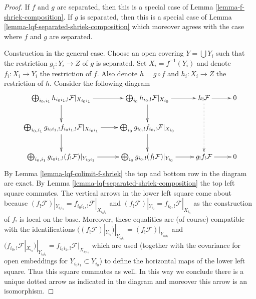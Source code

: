 \documentclass{stacks-project}
\theoremstyle{plain}
\theoremstyle{definition}
\theoremstyle{remark}
\numberwithin{equation}{subsection}
\begin{document}
\begin{proof}
If $f$ and $g$ are separated, then this is a special case of
Lemma \ref{lemma-f-shriek-composition}.
If $g$ is separated, then this is a special case of
Lemma \ref{lemma-lqf-separated-shriek-composition}
which moreover agrees with the case where $f$ and $g$ are separated.

\medskip\noindent
Construction in the general case. Choose an open covering $Y = \bigcup Y_i$
such that the restriction $g_i : Y_i \to Z$ of $g$ is separated.
Set $X_i = f^{-1}(Y_i)$ and denote $f_i : X_i \to Y_i$ the restriction
of $f$. Also denote $h = g \circ f$ and $h_i : X_i \to Z$ the restriction
of $h$. Consider the following diagram
$$
\xymatrix{
\bigoplus\nolimits_{i_0, i_1}
h_{i_0i_1, !}\mathcal{F}|_{X_{i_0i_1}} \ar[r] \ar[d] &
\bigoplus\nolimits_{i_0} h_{i_0, !}\mathcal{F}|_{X_{i_0}} \ar[r] \ar[d] &
h_!\mathcal{F} \ar[r] \ar@{..>}[dd] &
0 \\
\bigoplus\nolimits_{i_0, i_1}
g_{i_0i_1, !} f_{i_0i_1, !}\mathcal{F}|_{X_{i_0i_1}} \ar[r] \ar[d] &
\bigoplus\nolimits_{i_0}
g_{i_0, !} f_{i_0, !}\mathcal{F}|_{X_{i_0}} \ar[d] \\
\bigoplus\nolimits_{i_0, i_1}
g_{i_0i_1, !} (f_!\mathcal{F})|_{Y_{i_0i_1}} \ar[r] &
\bigoplus\nolimits_{i_0}
g_{i_0, !} (f_!\mathcal{F})|_{Y_{i_0}} \ar[r] &
g_!f_!\mathcal{F} \ar[r] &
0
}
$$
By Lemma \ref{lemma-lqf-colimit-f-shriek} the top and bottom row
in the diagram are exact. By Lemma \ref{lemma-lqf-separated-shriek-composition}
the top left square commutes. The vertical arrows in the
lower left square come about because
$(f_!\mathcal{F})|_{Y_{i_0i_1}} = f_{i_0i_1, !}\mathcal{F}|_{X_{i_0i_1}}$ and
$(f_!\mathcal{F})|_{Y_{i_0}} = f_{i_0, !}\mathcal{F}|_{X_{i_0}}$
as the construction of $f_!$ is local on the base. Moreover, these
equalities are (of course) compatible with the identifications
$((f_!\mathcal{F})|_{Y_{i_0}})|_{Y_{i_0i_1}} =
(f_!\mathcal{F})|_{Y_{i_0i_1}}$ and
$(f_{i_0, !}\mathcal{F}|_{X_{i_0}})|_{Y_{i_0i_1}} =
f_{i_0i_1, !}\mathcal{F}|_{X_{i_0i_1}}$
which are used (together with the covariance for open embeddings
for $Y_{i_0i_1} \subset Y_{i_0}$)
to define the horizontal maps of the lower left square.
Thus this square commutes as well.
In this way we conclude there is a unique
dotted arrow as indicated in the diagram and
moreover this arrow is an isomorphism.


\end{proof}
\end{document}
